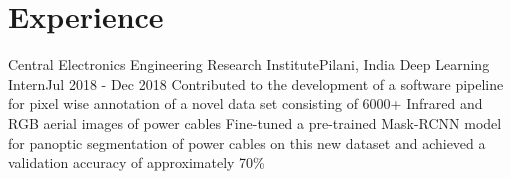 \section{Experience}
\resumeSubHeadingListStart

\resumeHeadingFour
{Central Electronics Engineering Research Institute}{Pilani, India}
{Deep Learning Intern}{Jul 2018 - Dec 2018}
\resumeItemListStart
{}
{Contributed to the development of a software pipeline for pixel wise annotation of a novel data set consisting of 6000+ Infrared and RGB aerial images of power cables}
{Fine-tuned a pre-trained Mask-RCNN model for panoptic segmentation of power cables on this new dataset and achieved a validation accuracy of approximately 70\%}
\resumeItemListEnd

\resumeSubHeadingListEnd
